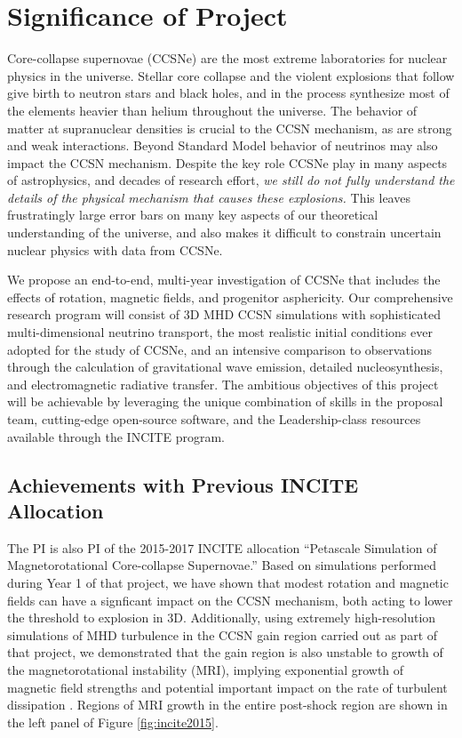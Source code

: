 \section{Significance of Project}

Core-collapse supernovae (CCSNe) are the most extreme laboratories for nuclear physics in the universe.
Stellar core collapse and the violent explosions that follow give birth to neutron stars and black holes, and in the process synthesize most of the elements heavier than helium throughout the universe.
The behavior of matter at supranuclear densities is crucial to the CCSN mechanism, as are strong and weak interactions.
Beyond Standard Model behavior of neutrinos may also impact the CCSN mechanism.
Despite the key role CCSNe play in many aspects of astrophysics, and decades of research effort, {\it we still do not fully understand the details of the physical mechanism that causes these explosions.}
This leaves frustratingly large error bars on many key aspects of our theoretical understanding of the universe, and also makes it difficult to constrain uncertain nuclear physics with data from CCSNe.

We propose an end-to-end, multi-year investigation of CCSNe that includes the effects of rotation, magnetic fields, and progenitor asphericity.
Our comprehensive research program will consist of 3D MHD CCSN simulations with sophisticated multi-dimensional neutrino transport, the most realistic initial conditions ever adopted for the study of CCSNe, and an intensive comparison to observations through the calculation of gravitational wave emission, detailed nucleosynthesis, and electromagnetic radiative transfer.
The ambitious objectives of this project will be achievable by leveraging the unique combination of skills in the proposal team, cutting-edge open-source software, and the Leadership-class resources available through the INCITE program.

\subsection{Achievements with Previous INCITE Allocation}
\label{sec:achievements}

The PI is also PI of the 2015-2017 INCITE allocation ``Petascale Simulation of Magnetorotational Core-collapse Supernovae.''
Based on simulations performed during Year 1 of that project, we have shown that modest rotation and magnetic fields can have a signficant impact on the CCSN mechanism, both acting to lower the threshold to explosion in 3D.
Additionally, using extremely high-resolution simulations of MHD turbulence in the CCSN gain region carried out as part of that project, we demonstrated that the gain region is also unstable to growth of the magnetorotational instability (MRI), implying exponential growth of magnetic field strengths and potential important impact on the rate of turbulent dissipation \citep[e.g.,][]{Thompson:2005}.
Regions of MRI growth in the entire post-shock region are shown in the left panel of Figure \ref{fig:incite2015}.

